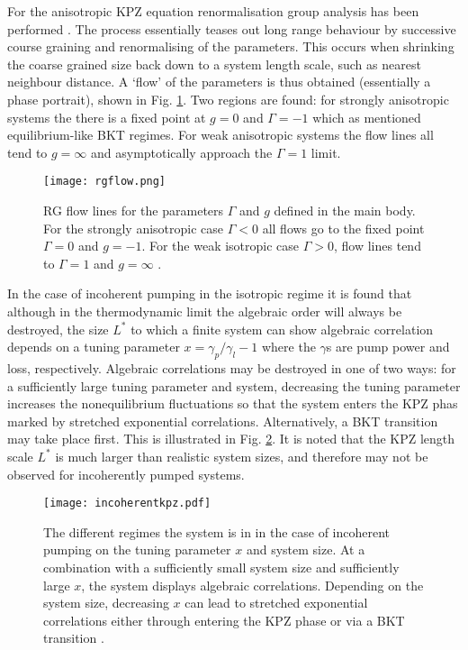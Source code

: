 \documentclass[letterpaper, 10 pt, conference]{IEEEtran}  %
\newcommand{\fig}[1]{Fig. #1}
\begin{document}
For the anisotropic KPZ equation renormalisation group analysis has been performed \cite{PhysRevLett.111.088701}.
The process essentially teases out long range behaviour by successive course graining and renormalising of the parameters. 
This occurs when shrinking the coarse grained size back down to a system length scale, such as nearest neighbour distance.
A `flow' of the parameters is thus obtained (essentially a phase portrait), shown in \fig{\ref{fig:rgflows}}.
Two regions are found: for strongly anisotropic systems the there is a fixed point at $g=0$ and $\Gamma = -1$ which as mentioned equilibrium-like BKT regimes. 
For weak anisotropic systems the flow lines all tend to $g= \infty$ and asymptotically approach the $\Gamma =1$ limit. 
\begin{figure}[htbp!]
	\centering
	\texttt{[image: rgflow.png]}
	\caption{RG flow lines for the parameters $\Gamma$ and $g$ defined in the main body. 
	For the strongly anisotropic case $\Gamma < 0$ all flows go to the fixed point $\Gamma =0$ and $g=-1$. 
	For the weak isotropic case $\Gamma >0$, flow lines tend to $\Gamma =1$ and $g = \infty$ \cite{PhysRevLett.111.088701}. }
	\label{fig:rgflows}

\end{figure}

In the case of incoherent pumping in the isotropic regime it is found \cite{2015PhRvX...5a1017A} that although in the thermodynamic limit the algebraic order will always be destroyed, the size $L^*$ to which a finite system can show algebraic correlation depends on a tuning parameter $x= \gamma_p / \gamma_l -1$ where the $\gamma$s are pump power and loss, respectively. 
Algebraic correlations may be destroyed in one of two ways: for a sufficiently large tuning parameter and system, decreasing the tuning parameter increases the nonequilibrium fluctuations so that the system enters the KPZ phas marked by stretched exponential correlations. 
Alternatively, a BKT transition may take place first. 
This is illustrated in \fig{\ref{fig:incoherentkpz}}.
It is noted that the KPZ length scale $L^*$ is much larger than realistic system sizes, and therefore may not be observed for incoherently pumped systems. 

\begin{figure}
	\centering
	\texttt{[image: incoherentkpz.pdf]}
	\caption{The different regimes the system is in in the case of incoherent pumping on the tuning parameter $x$ and system size. At a combination with a sufficiently small system size and sufficiently large $x$, the system displays algebraic correlations. Depending on the system size, decreasing $x$ can lead to stretched exponential correlations either through entering the KPZ phase or via a BKT transition \cite{2015PhRvX...5a1017A}.}
	\label{fig:incoherentkpz}
\end{figure}
\end{document}
